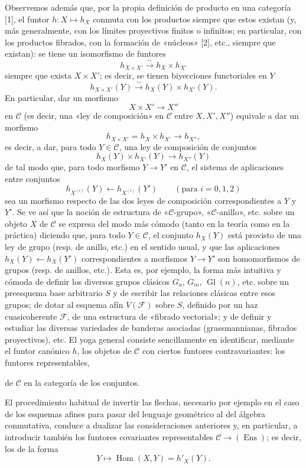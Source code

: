 Observemos además que, por la propia definición de producto en una categoría
[1], el funtor $h:X\longmapsto h_X$ conmuta con los productos siempre que estos
existan (y, más generalmente, con los límites proyectivos finitos o infinitos;
en particular, con los productos fibrados, con la formación de «núcleos» [2],
etc., siempre que existan): se tiene un isomorfismo de funtores
\[
  h_{X\times X'}\xrightarrow{\sim}h_X\times h_{X'}
\]
siempre que exista $X\times X'$; es decir, se tienen biyecciones functoriales
en $Y$
\[
  h_{X\times X'}(Y)\xrightarrow{\sim}h_X(Y)\times h_{X'}(Y).
\]
En particular, dar un morfismo
\[
  X\times X'\longrightarrow X''
\]
en $\mathcal C$ (es decir, una «ley de composición» en $\mathcal C$ entre
$X,X',X''$) equivale a dar un morfismo
\[
  h_{X\times X'}=h_X\times h_{X'}\longrightarrow h_{X''},
\]
es decir, a dar, para todo $Y\in\mathcal C$, una ley de composición de
conjuntos
\[
  h_X(Y)\times h_{X'}(Y)\longrightarrow h_{X''}(Y)
\]
de tal modo que, para todo morfismo $Y\longrightarrow Y'$ en $\mathcal C$, el
sistema de aplicaciones entre conjuntos
\[
  h_{X^{(i)}}(Y)\longleftarrow h_{X^{(i)}}(Y')
  \qquad(\text{para }i=0,1,2)
\]
sea un morfismo respecto de las dos leyes de composición correspondientes a
$Y$ y $Y'$. Se ve así que la noción de estructura de «$\mathcal C$-grupo»,
«$\mathcal C$-anillo», etc. sobre un objeto $X$ de $\mathcal C$ se expresa del
modo más cómodo (tanto en la teoría como en la práctica) diciendo que, para
todo $Y\in\mathcal C$, el conjunto $h_X(Y)$ está provisto de una ley de grupo
(resp. de anillo, etc.) en el sentido usual, y que las aplicaciones
$h_X(Y)\longleftarrow h_X(Y')$ correspondientes a morfismos
$Y\longrightarrow Y'$ son homomorfismos de grupos (resp. de anillos, etc.).
Esta es, por ejemplo, la forma más intuitiva y cómoda de definir los diversos
grupos clásicos $G_a$, $G_m$, $\operatorname{Gl}(n)$, etc. sobre un preesquema
base arbitrario $S$ y de escribir las relaciones clásicas entre esos grupos;
de dotar al esquema afín $V(\mathcal F)$ sobre $S$, definido por un haz
cuasicoherente $\mathcal F$, de una estructura de «fibrado vectorial»; y de
definir y estudiar las diversas variedades de banderas asociadas
(grassmannianas, fibrados proyectivos), etc. El yoga general consiste
sencillamente en identificar, mediante el funtor canónico $h$, los objetos de
$\mathcal C$ con ciertos funtores contravariantes: los funtores representables,

de $\mathcal C$ en la categoría de los conjuntos.

El procedimiento habitual de invertir las flechas, necesario por ejemplo en el
caso de los esquemas afines para pasar del lenguaje geométrico al del álgebra
conmutativa, conduce a dualizar las consideraciones anteriores y, en
particular, a introducir también los funtores covariantes representables
$\mathcal C\longrightarrow(\operatorname{Ens})$; es decir, los de la forma
\[
  Y\longmapsto\operatorname{Hom}(X,Y)=h'_X(Y).
\]

